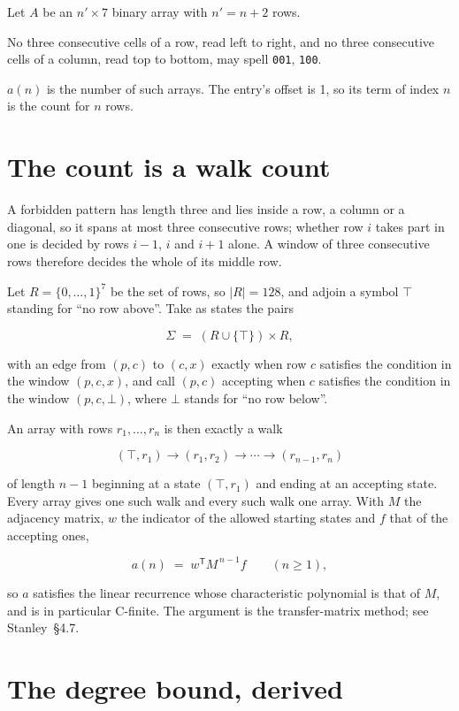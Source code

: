 \documentclass[11pt]{article}
\theoremstyle{definition}
\begin{document}
Let $A$ be an $n' \times 7$ binary array with $n' = n + 2$ rows.

No three consecutive cells of a row, read left to right, and no three consecutive cells of a column, read top to bottom, may spell \texttt{001}, \texttt{100}.

$a(n)$ is the number of such arrays. The entry's offset is 1, so its term of index $n$ is the count for $n$ rows.

\section{The count is a walk count}

A forbidden pattern has length three and lies inside a row, a column or a diagonal, so it spans at most three consecutive rows; whether row $i$ takes part in one is decided by rows $i-1$, $i$ and $i+1$ alone. A window of three consecutive rows therefore decides the whole of its middle row.

Let $R = \{0,\dots,1\}^{7}$ be the set of rows, so $|R| = 128$, and adjoin a symbol $\top$ standing for ``no row above''. Take as states the pairs

\[\Sigma \;=\; (R \cup \{\top\}) \times R,\]

with an edge from $(p,c)$ to $(c,x)$ exactly when row $c$ satisfies the condition in the window $(p,c,x)$, and call $(p,c)$ accepting when $c$ satisfies the condition in the window $(p,c,\bot)$, where $\bot$ stands for ``no row below''.

An array with rows $r_1,\dots,r_n$ is then exactly a walk

\[(\top,r_1) \to (r_1,r_2) \to \cdots \to (r_{n-1},r_n)\]

of length $n-1$ beginning at a state $(\top,r_1)$ and ending at an accepting state. Every array gives one such walk and every such walk one array. With $M$ the adjacency matrix, $w$ the indicator of the allowed starting states and $f$ that of the accepting ones,

\[a(n) \;=\; w^{\mathsf T} M^{\,n-1} f \qquad (n \ge 1),\]

so $a$ satisfies the linear recurrence whose characteristic polynomial is that of $M$, and is in particular C-finite. The argument is the transfer-matrix method; see Stanley~\S4.7.

\section{The degree bound, derived}
\end{document}

